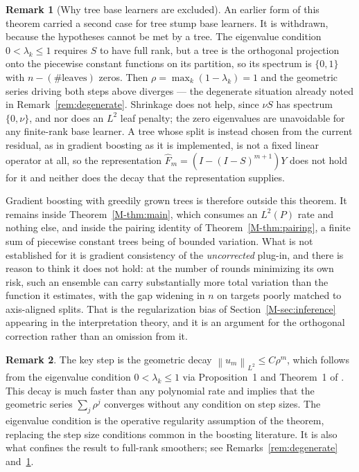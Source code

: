 \documentclass[12pt,a4paper]{article}
\numberwithin{equation}{section}
\theoremstyle{plain}
\theoremstyle{definition}
\newtheorem{remark}{Remark}
\newcommand{\norm}[1]{\left\| #1 \right\|}
\begin{document}
	\begin{remark}[Why tree base learners are excluded]
		\label{rem:boosting_trees}
		An earlier form of this theorem carried a second case for tree stump base
		learners. It is withdrawn, because the hypotheses cannot be met by a tree.
		The eigenvalue condition $0 < \lambda_k \leq 1$ requires $S$ to have full
		rank, but a tree is the orthogonal projection onto the piecewise constant
		functions on its partition, so its spectrum is $\{0,1\}$ with
		$n - (\#\text{leaves})$ zeros. Then $\rho = \max_k(1-\lambda_k) = 1$ and
		the geometric series driving both steps above diverges --- the degenerate
		situation already noted in Remark~\ref{rem:degenerate}. Shrinkage does not
		help, since $\nu S$ has spectrum $\{0,\nu\}$, and nor does an $L^2$ leaf
		penalty; the zero eigenvalues are unavoidable for any finite-rank base
		learner. A tree whose split is instead chosen from the current residual,
		as in gradient boosting as it is implemented, is not a fixed linear
		operator at all, so the representation
		$\hat{F}_m = (I - (I-S)^{m+1})Y$ does not hold for it and neither does the
		decay that the representation supplies.

		Gradient boosting with greedily grown trees is therefore outside this
		theorem. It remains inside Theorem~\ref{M-thm:main}, which consumes an
		$L^2(P)$ rate and nothing else, and inside the pairing identity of
		Theorem~\ref{M-thm:pairing}, a finite sum of piecewise constant trees
		being of bounded variation. What is not established for it is gradient
		consistency of the \emph{uncorrected} plug-in, and there is reason to
		think it does not hold: at the number of rounds minimizing its own risk,
		such an ensemble can carry substantially more total variation than the
		function it estimates, with the gap widening in $n$ on targets poorly
		matched to axis-aligned splits. That is the regularization bias of
		Section~\ref{M-sec:inference} appearing in the interpretation theory, and
		it is an argument for the orthogonal correction rather than an omission
		from it.
	\end{remark}

\begin{remark}
		The key step is the geometric decay $\norm{u_m}_{L^2} \leq C\rho^m$,
		which follows from the eigenvalue condition $0 < \lambda_k \leq 1$ via Proposition~1
		and Theorem~1 of \citet{buhlmann2003boosting}. This decay is much faster than any
		polynomial rate and implies that the geometric series $\sum_j \rho^j$ converges
		without any condition on step sizes. The eigenvalue condition is the operative
		regularity assumption of the theorem, replacing the step size conditions common
		in the boosting literature. It is also what confines the result to full-rank
		smoothers; see Remarks~\ref{rem:degenerate} and~\ref{rem:boosting_trees}.
	\end{remark}
	
\end{document}
